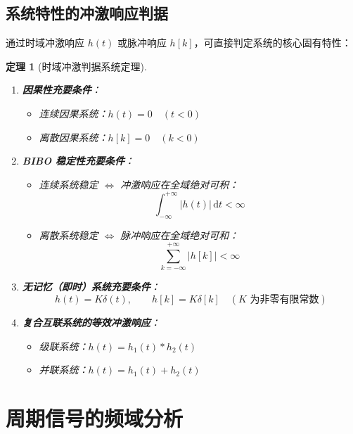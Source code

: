 \documentclass[11pt,a4paper,fontset=fandol]{ctexart}
\newtheorem{theorem}{定理}[section]
\theoremstyle{remark}
\begin{document}
\subsection{系统特性的冲激响应判据}

通过时域冲激响应 $h(t)$ 或脉冲响应 $h[k]$，可直接判定系统的核心固有特性：

\begin{theorem}[时域冲激判据系统定理]
\begin{enumerate}
    \item \textbf{因果性充要条件}：
    \begin{itemize}
        \item 连续因果系统：$h(t) = 0 \quad (t < 0)$
        \item 离散因果系统：$h[k] = 0 \quad (k < 0)$
    \end{itemize}
    \item \textbf{BIBO 稳定性充要条件}：
    \begin{itemize}
        \item 连续系统稳定 $\iff$ 冲激响应在全域绝对可积：
        \begin{equation}
            \int_{-\infty}^{+\infty} |h(t)|\,\mathrm{d}t < \infty
        \end{equation}
        \item 离散系统稳定 $\iff$ 脉冲响应在全域绝对可和：
        \begin{equation}
            \sum_{k=-\infty}^{+\infty} |h[k]| < \infty
        \end{equation}
    \end{itemize}
    \item \textbf{无记忆（即时）系统充要条件}：
    \begin{equation}
        h(t) = K \delta(t), \qquad h[k] = K \delta[k] \quad (K \text{ 为非零有限常数})
    \end{equation}
    \item \textbf{复合互联系统的等效冲激响应}：
    \begin{itemize}
        \item 级联系统：$h(t) = h_1(t) * h_2(t)$
        \item 并联系统：$h(t) = h_1(t) + h_2(t)$
    \end{itemize}
\end{enumerate}
\end{theorem}

\section{周期信号的频域分析}
\end{document}
